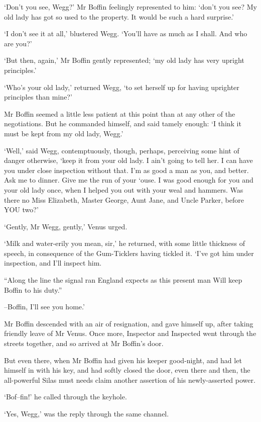 ‘Don’t you see, Wegg?’ Mr Boffin feelingly represented to him: ‘don’t
you see? My old lady has got so used to the property. It would be such a
hard surprise.’

‘I don’t see it at all,’ blustered Wegg. ‘You’ll have as much as I
shall. And who are you?’

‘But then, again,’ Mr Boffin gently represented; ‘my old lady has very
upright principles.’

‘Who’s your old lady,’ returned Wegg, ‘to set herself up for having
uprighter principles than mine?’

Mr Boffin seemed a little less patient at this point than at any other
of the negotiations. But he commanded himself, and said tamely enough:
‘I think it must be kept from my old lady, Wegg.’

‘Well,’ said Wegg, contemptuously, though, perhaps, perceiving some hint
of danger otherwise, ‘keep it from your old lady. I ain’t going to tell
her. I can have you under close inspection without that. I’m as good a
man as you, and better. Ask me to dinner. Give me the run of your ‘ouse.
I was good enough for you and your old lady once, when I helped you out
with your weal and hammers. Was there no Miss Elizabeth, Master George,
Aunt Jane, and Uncle Parker, before YOU two?’

‘Gently, Mr Wegg, gently,’ Venus urged.

‘Milk and water-erily you mean, sir,’ he returned, with some little
thickness of speech, in consequence of the Gum-Ticklers having tickled
it. ‘I’ve got him under inspection, and I’ll inspect him.

     “Along the line the signal ran
     England expects as this present man
     Will keep Boffin to his duty.”

--Boffin, I’ll see you home.’

Mr Boffin descended with an air of resignation, and gave himself up,
after taking friendly leave of Mr Venus. Once more, Inspector and
Inspected went through the streets together, and so arrived at Mr
Boffin’s door.

But even there, when Mr Boffin had given his keeper good-night, and had
let himself in with his key, and had softly closed the door, even there
and then, the all-powerful Silas must needs claim another assertion of
his newly-asserted power.

‘Bof--fin!’ he called through the keyhole.

‘Yes, Wegg,’ was the reply through the same channel.

